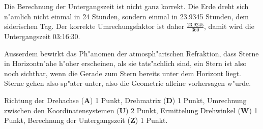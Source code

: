 \begin{diskussion}
Die Berechnung der Untergangszeit ist nicht ganz korrekt. Die Erde dreht
sich n"amlich nicht einmal in 24 Stunden, sondern einmal in 23.9345 Stunden,
dem siderischen Tag.
Der korrekte Umrechungsfaktor ist daher $\frac{23.9245}{360}$, damit
wird die Untergangszeit 03:16:30.

Ausserdem bewirkt das Ph"anomen der atmosph"arischen Refraktion, dass
Sterne in Horizontn"ahe h"oher erscheinen, als sie tats"achlich
sind, ein Stern ist also noch sichtbar, wenn die Gerade zum Stern bereits
unter dem Horizont liegt.
Sterne gehen also sp"ater unter, also die Geometrie alleine vorhersagen
w"urde.
\end{diskussion}

\begin{bewertung}
Richtung der Drehachse (\textbf{A}) 1 Punkt,
Drehmatrix (\textbf{D}) 1 Punkt,
Umrechnung zwischen den Koordinatensystemen (\textbf{U}) 2 Punkt,
Ermittelung Drehwinkel (\textbf{W}) 1 Punkt,
Berechnung der Untergangszeit (\textbf{Z}) 1 Punkt.
\end{bewertung}

